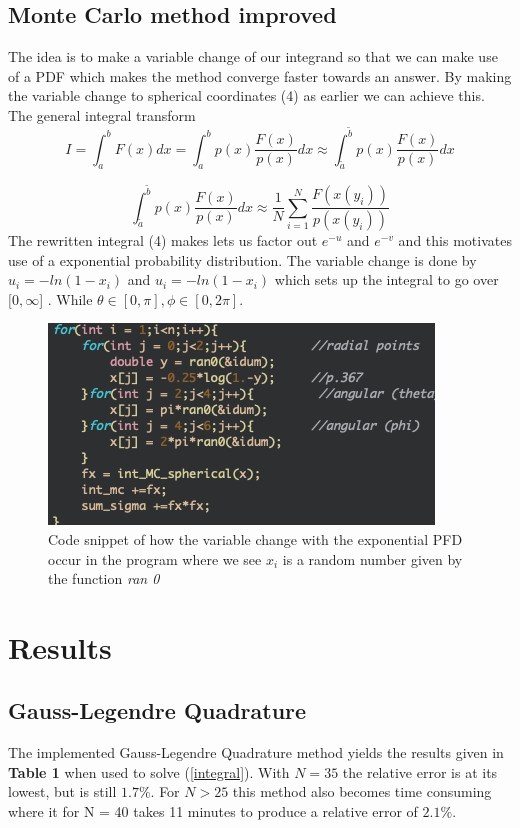 \documentclass[twoside,twocolumn]{article}
\begin{document}
\subsection{Monte Carlo method improved}

The idea is to make a variable change of our integrand so that we can make use of a PDF which makes the method converge faster towards an answer. By making the variable change to spherical coordinates (4) as earlier we can achieve this. The general integral transform 
\[
I =\int_{a}^{b}F(x)dx = \int_{a}^{b}p(x)\frac{F(x)}{p(x)}dx\approx \int_{\tilde{a}}^{\tilde{b}}p(x)\frac{F(x)}{p(x)}dx
\]

\begin{equation}
\int_{\tilde{a}}^{\tilde{b}}p(x)\frac{F(x)}{p(x)}dx\approx \frac{1}{N}\sum_{i=1}^{N} \frac{ F(x(y_i))}{p(x(y_i))}
\end{equation}
The rewritten integral (4) makes lets us factor out $e^{-u}$ and $e^{-v}$ and this motivates use of a exponential probability distribution. The variable change is done by $u_i = -ln(1-x_i)$ and $u_i = -ln(1-x_i)$ which sets up the integral to go over $[0,\infty$] . While $ \theta \in [0,\pi], \phi \in [0,2\pi]$.

\begin{figure}[h]
\center
\caption{Code snippet of how the variable change with the exponential PFD occur in the program where we see $x_i$ is a random number given by the function \textit{ran 0}}
\includegraphics[scale=0.55]{var2.png}

\end{figure}



\section{Results}


\subsection{Gauss-Legendre Quadrature}
The implemented Gauss-Legendre Quadrature method yields the results given in \textbf{Table 1} when used to solve (\ref{integral}). With $N=35$ the relative error is at its lowest, but is still $1.7 \%$. For $N >25$ this method also becomes time consuming where it for N = 40 takes 11 minutes to produce a relative error of $2.1 \%$.
\end{document}

